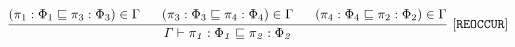  \begin{gather*}
\frac{
\begin{matrix}
\text{\codeme{ (\pi_1 : \effect_1 \CONTAIN \pi_3 : \effect_3) \in \Gamma  }} 
\quad\ \ 
\text{\codeme{(\pi_3 : \effect_3 \CONTAIN  \pi_4 : \effect_4) \in {\Gamma} }} \quad\  \ 
\text{\codeme{ (\pi_4 : \effect_4 \CONTAIN \pi_2 : \effect_2) \in {\Gamma}  }}
\end{matrix}
}{\text{\code{\Gamma  \vdash  \pi_1 : \effect_1 \CONTAIN  \pi_2 : \effect_2 }} }
\ \codeme{[REOCCUR]}
\end{gather*}